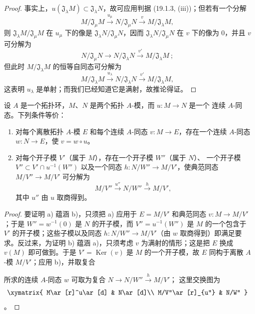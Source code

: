 \begin{proof}
事实上，$u(\mathfrak J_\lambda M)\subset\mathfrak J_\lambda N$，故可应用判据
(19.1.3, (iii))；但若有一个分解
\[
  M/\mathfrak J_\mu M\xrightarrow{u_\mu}
  N/\mathfrak J_\mu N\xrightarrow{v}M/\mathfrak J_\lambda M,
\]
则 $\mathfrak J_\lambda M/\mathfrak J_\mu M$ 在 $u_\mu$ 下的像是
$\mathfrak J_\lambda N/\mathfrak J_\mu N$，因而
$\mathfrak J_\lambda N/\mathfrak J_\mu N$ 在 $v$ 下的像为 0，并且 $v$ 可分解为
\[
  N/\mathfrak J_\mu N\longrightarrow N/\mathfrak J_\lambda N
  \xrightarrow{v'}M/\mathfrak J_\lambda M~;
\]
但此时 $M/\mathfrak J_\lambda M$ 的恒等自同态可分解为
\[
  M/\mathfrak J_\lambda M\xrightarrow{u_\lambda}
  N/\mathfrak J_\lambda N\xrightarrow{v'}M/\mathfrak J_\lambda M,
\]
这表明 $u_\lambda$ 是单射；而我们已经知道它是满射，故推论得证。
\end{proof}

\begin{proposition}[19.1.5]
\label{0.19.1.5-fr}
设 $A$ 是一个拓扑环，$M$、$N$ 是两个拓扑 $A$-模，而 $u:M\to N$ 是一个
连续 $A$-同态。下列条件等价：
\begin{enumerate}
  \item[a)] 对每个离散拓扑 $A$-模 $E$ 和每个连续 $A$-同态
  $v:M\to E$，存在一个连续 $A$-同态 $w:N\to E$，使 $v=w\circ u$。
  \item[b)] 对每个开子模 $V'$（属于 $M$），存在一个开子模 $W''$（属于 $N$）、
  一个开子模 $V''\subset V'\cap u^{-1}(W'')$ 以及一个同态
  $h:N/W''\to M/V'$，使典范同态 $M/V''\to M/V'$ 可分解为
  \[
    M/V''\xrightarrow{u''}N/W''\xrightarrow{h}M/V',
  \]
  其中 $u''$ 由 $u$ 取商得到。
\end{enumerate}
\end{proposition}

\begin{proof}
要证明 a) 蕴涵 b)，只须把 a) 应用于 $E=M/V'$ 和典范同态
$v:M\to M/V'$；于是 $W''=w^{-1}(0)$ 是 $N$ 的开子模，而
$V''=u^{-1}(W'')$ 是 $M$ 的一个包含于 $V'$ 的开子模；这些子模以及同态
$h:N/W''\to M/V'$（由 $w$ 取商得到）即满足要求。反过来，为证明 b) 蕴涵
a)，只须考虑 $v$ 为满射的情形；这是把 $E$ 换成 $v(M)$ 即可做到。于是
$V'=\operatorname{Ker}(v)$ 是 $M$ 的一个开子模，故 $E$ 同构于离散 $A$-模
$M/V'$；应用 b)，并取复合


\noindent 所求的连续 $A$-同态 $w$ 可取为复合
$N\to N/W''\xrightarrow{h}M/V'$；
这里交换图为
\[
  \xymatrix{
    M\ar[r]^u\ar[d] & N\ar[d]\\
    M/V''\ar[r]_{u''} & N/W''
  }
\]
。
\end{proof}


